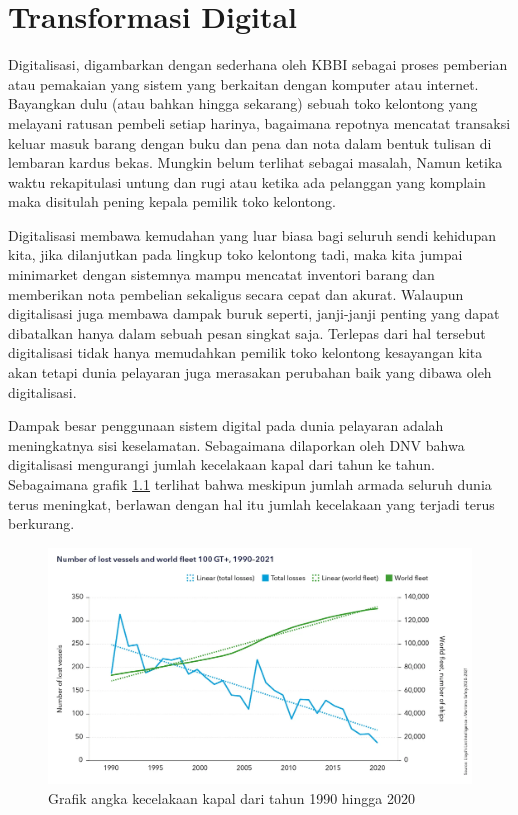 \chapter{Transformasi Digital}
\label{ch:transformasi-digital}

Digitalisasi, digambarkan dengan sederhana oleh KBBI sebagai proses pemberian atau pemakaian yang sistem yang berkaitan dengan komputer atau internet. Bayangkan dulu (atau bahkan hingga sekarang) sebuah toko kelontong yang melayani ratusan pembeli setiap harinya, bagaimana repotnya mencatat transaksi keluar masuk barang dengan buku dan pena dan nota dalam bentuk tulisan di lembaran kardus bekas. Mungkin belum terlihat sebagai masalah, Namun ketika waktu rekapitulasi untung dan rugi atau ketika ada pelanggan yang komplain maka disitulah pening kepala pemilik toko kelontong.

Digitalisasi membawa kemudahan yang luar biasa bagi seluruh sendi kehidupan kita, jika dilanjutkan pada lingkup toko kelontong tadi, maka kita jumpai minimarket dengan sistemnya mampu mencatat inventori barang dan memberikan nota pembelian sekaligus secara cepat dan akurat. Walaupun digitalisasi juga membawa dampak buruk seperti, janji-janji penting yang dapat dibatalkan hanya dalam sebuah pesan singkat saja. Terlepas dari hal tersebut digitalisasi tidak hanya memudahkan pemilik toko kelontong kesayangan kita akan tetapi dunia pelayaran juga merasakan perubahan baik yang dibawa oleh digitalisasi.

Dampak besar penggunaan sistem digital pada dunia pelayaran adalah meningkatnya sisi keselamatan. Sebagaimana dilaporkan oleh DNV bahwa digitalisasi mengurangi jumlah kecelakaan kapal dari tahun ke tahun. Sebagaimana grafik \ref{fig:pengurangan-kecelakaan-kapal} terlihat bahwa meskipun jumlah armada seluruh dunia terus meningkat, berlawan dengan hal itu jumlah kecelakaan yang terjadi terus berkurang.
\begin{figure}[!htbp]
    \centering
    \includegraphics[width=0.65\linewidth]{images/number_of_lost_vessels.jpg.jpg}
    \caption{Grafik angka kecelakaan kapal dari tahun 1990 hingga 2020}
    \label{fig:pengurangan-kecelakaan-kapal}
\end{figure}


